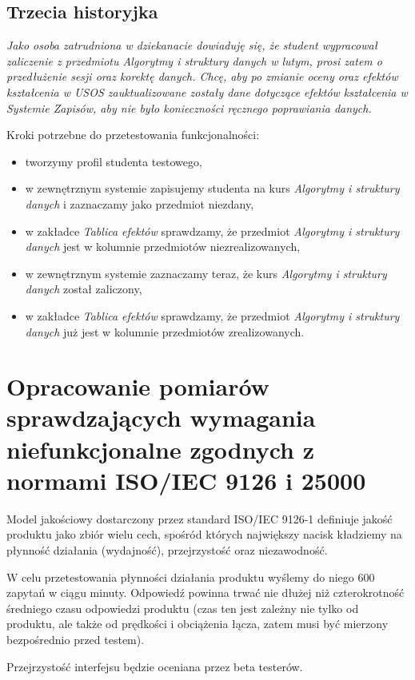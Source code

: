 \documentclass{article}
\begin{document}
\subsection{Trzecia historyjka}
\textit{Jako osoba zatrudniona w dziekanacie dowiaduję się, że student wypracował zaliczenie z przedmiotu \textit{Algorytmy i struktury danych} w lutym, prosi zatem o przedłużenie sesji oraz korektę danych. 
Chcę, aby po zmianie oceny oraz efektów kształcenia w USOS zauktualizowane zostały dane dotyczące efektów kształcenia w Systemie Zapisów, aby nie było konieczności ręcznego poprawiania danych.}

\medskip
\noindent Kroki potrzebne do przetestowania funkcjonalności:
\begin{itemize}
 \item tworzymy profil studenta testowego,
 \item w zewnętrznym systemie zapisujemy studenta na kurs \textit{Algorytmy i struktury danych} i zaznaczamy jako przedmiot niezdany,
 \item w zakładce \textit{Tablica efektów} sprawdzamy, że przedmiot \textit{Algorytmy i struktury danych} jest w kolumnie przedmiotów niezrealizowanych,
 \item w zewnętrznym systemie zaznaczamy teraz, że kurs \textit{Algorytmy i struktury danych} został zaliczony,
 \item w zakładce \textit{Tablica efektów} sprawdzamy, że przedmiot \textit{Algorytmy i struktury danych} już jest w kolumnie przedmiotów zrealizowanych.
\end{itemize}

\section{Opracowanie pomiarów sprawdzających wymagania niefunkcjonalne zgodnych z normami ISO/IEC 9126 i 25000}
Model jakościowy dostarczony przez standard ISO/IEC 9126-1 definiuje jakość produktu jako zbiór wielu cech, spośród których największy nacisk kładziemy na płynność działania (wydajność), przejrzystość oraz niezawodność.

W celu przetestowania płynności działania produktu wyślemy do niego 600 zapytań w ciągu minuty.
Odpowiedź powinna trwać nie dłużej niż czterokrotność średniego czasu odpowiedzi produktu (czas ten jest zależny nie tylko od produktu, ale także od prędkości i obciążenia łącza, zatem musi być mierzony bezpośrednio przed testem).

Przejrzystość interfejsu będzie oceniana przez beta testerów.
\end{document}

